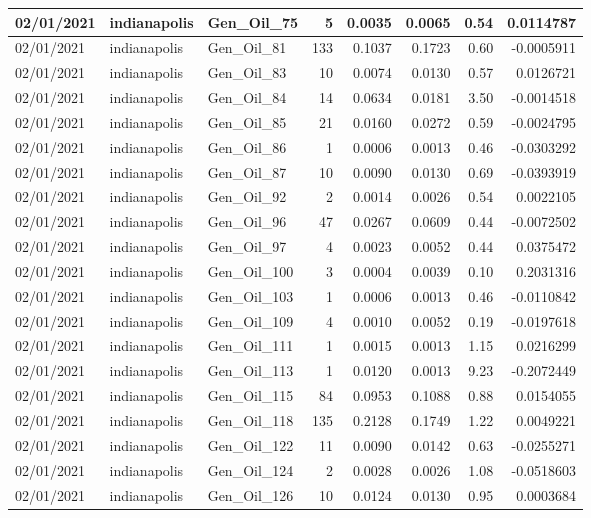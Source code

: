 \documentclass[
  letterpaper,
  DIV=11,
  numbers=noendperiod]{scrartcl}
\begin{document}
\begin{tabular}{l|l|l|r|r|r|r|r}
\hline
02/01/2021 & indianapolis & Gen\_Oil\_75 & 5 & 0.0035 & 0.0065 & 0.54 & 0.0114787\\
\hline
02/01/2021 & indianapolis & Gen\_Oil\_81 & 133 & 0.1037 & 0.1723 & 0.60 & -0.0005911\\
\hline
02/01/2021 & indianapolis & Gen\_Oil\_83 & 10 & 0.0074 & 0.0130 & 0.57 & 0.0126721\\
\hline
02/01/2021 & indianapolis & Gen\_Oil\_84 & 14 & 0.0634 & 0.0181 & 3.50 & -0.0014518\\
\hline
02/01/2021 & indianapolis & Gen\_Oil\_85 & 21 & 0.0160 & 0.0272 & 0.59 & -0.0024795\\
\hline
02/01/2021 & indianapolis & Gen\_Oil\_86 & 1 & 0.0006 & 0.0013 & 0.46 & -0.0303292\\
\hline
02/01/2021 & indianapolis & Gen\_Oil\_87 & 10 & 0.0090 & 0.0130 & 0.69 & -0.0393919\\
\hline
02/01/2021 & indianapolis & Gen\_Oil\_92 & 2 & 0.0014 & 0.0026 & 0.54 & 0.0022105\\
\hline
02/01/2021 & indianapolis & Gen\_Oil\_96 & 47 & 0.0267 & 0.0609 & 0.44 & -0.0072502\\
\hline
02/01/2021 & indianapolis & Gen\_Oil\_97 & 4 & 0.0023 & 0.0052 & 0.44 & 0.0375472\\
\hline
02/01/2021 & indianapolis & Gen\_Oil\_100 & 3 & 0.0004 & 0.0039 & 0.10 & 0.2031316\\
\hline
02/01/2021 & indianapolis & Gen\_Oil\_103 & 1 & 0.0006 & 0.0013 & 0.46 & -0.0110842\\
\hline
02/01/2021 & indianapolis & Gen\_Oil\_109 & 4 & 0.0010 & 0.0052 & 0.19 & -0.0197618\\
\hline
02/01/2021 & indianapolis & Gen\_Oil\_111 & 1 & 0.0015 & 0.0013 & 1.15 & 0.0216299\\
\hline
02/01/2021 & indianapolis & Gen\_Oil\_113 & 1 & 0.0120 & 0.0013 & 9.23 & -0.2072449\\
\hline
02/01/2021 & indianapolis & Gen\_Oil\_115 & 84 & 0.0953 & 0.1088 & 0.88 & 0.0154055\\
\hline
02/01/2021 & indianapolis & Gen\_Oil\_118 & 135 & 0.2128 & 0.1749 & 1.22 & 0.0049221\\
\hline
02/01/2021 & indianapolis & Gen\_Oil\_122 & 11 & 0.0090 & 0.0142 & 0.63 & -0.0255271\\
\hline
02/01/2021 & indianapolis & Gen\_Oil\_124 & 2 & 0.0028 & 0.0026 & 1.08 & -0.0518603\\
\hline
02/01/2021 & indianapolis & Gen\_Oil\_126 & 10 & 0.0124 & 0.0130 & 0.95 & 0.0003684\\

\end{tabular}
\end{document}
